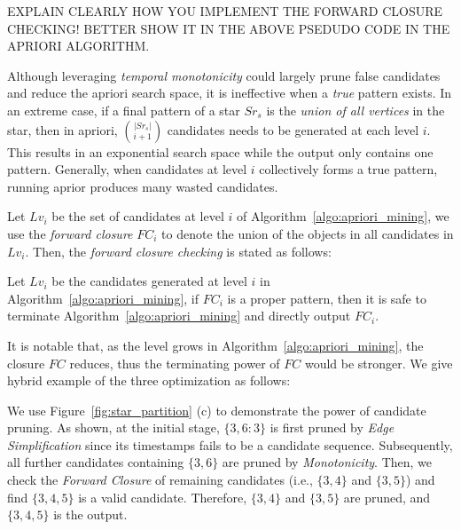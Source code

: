 EXPLAIN CLEARLY HOW YOU IMPLEMENT THE FORWARD CLOSURE CHECKING! BETTER SHOW IT IN THE ABOVE PSEDUDO CODE IN THE APRIORI ALGORITHM.

Although leveraging \emph{temporal monotonicity} could largely prune
false candidates and reduce the apriori search space, 
it is ineffective when a \textit{true} pattern exists. 
In an extreme case, if a final pattern of a star $Sr_s$ is 
the \textit{union of all vertices} in the star,
then in apriori, ${|Sr_s|}\choose{i + 1}$ candidates needs to be generated at 
each level $i$. This results in an exponential search space while
the output only contains one pattern.  
Generally, when candidates at level $i$ collectively forms a true pattern, 
running aprior produces many wasted candidates. 

Let $Lv_i$ be the set of candidates at level $i$ of Algorithm~\ref{algo:apriori_mining},
we use the \emph{forward closure} $FC_i$ to denote the union of the objects in
all candidates in $Lv_i$. Then, the \emph{forward closure checking} is stated as follows:
\begin{theorem}
\label{THM:SPM_FCC}
Let $Lv_i$ be the candidates generated at level $i$ in Algorithm~\ref{algo:apriori_mining},
if $FC_i$ is a proper pattern, then it is safe to terminate Algorithm~\ref{algo:apriori_mining}
and directly output $FC_i$.
\end{theorem}


It is notable that, as the level grows in Algorithm~\ref{algo:apriori_mining}, the closure $FC$
reduces, thus the terminating power of $FC$ would be stronger. We give hybrid example of the three
optimization as follows:
%

\begin{example}
We use Figure~\ref{fig:star_partition} (c) to 
demonstrate the power of candidate pruning. 
As shown, at the initial stage, $\{3,6:3\}$ is first pruned by \textit{Edge Simplification} since its
timestamps fails to be a candidate sequence. Subsequently, all further candidates containing $\{3,6\}$ 
are pruned by \textit{Monotonicity}. Then, we check the \textit{Forward Closure} 
of remaining candidates (i.e., $\{3,4\}$ and $\{3,5\}$) and find $\{3,4,5\}$ is a
valid candidate. Therefore, $\{3,4\}$ and $\{3,5\}$ are pruned, and $\{3,4,5\}$ is the output.
\end{example}






